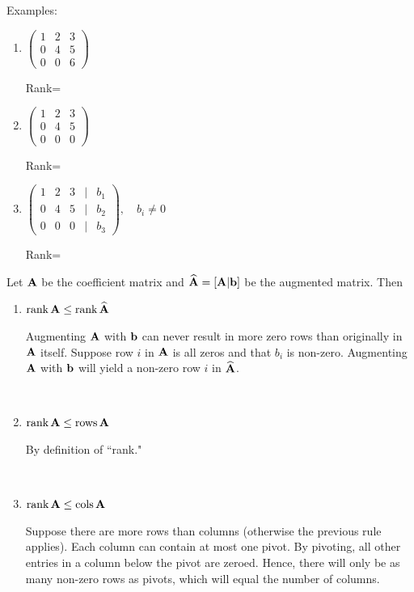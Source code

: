 \documentclass[]{book}
\theoremstyle{definition}
\theoremstyle{definition}
\theoremstyle{definition}
\theoremstyle{remark}
\begin{document}
Examples:

\begin{enumerate}
        \item \parbox[t]{2in}{$\begin{pmatrix} 1 & 2 & 3 \\
            0 & 4 & 5 \\
            0 & 0 & 6 \end{pmatrix}$}
              Rank=\phantom{3}
        \item \parbox[t]{2in}{$\begin{pmatrix} 1 & 2 & 3 \\ 
            0 & 4 & 5 \\
            0 & 0 & 0 \end{pmatrix}$}
            Rank=\phantom{2}

        \item \parbox[t]{2in}{$\begin{pmatrix} 1 & 2 & 3  & | & b_1 \\
            0 & 4 & 5 & | & b_2 \\
            0 & 0 & 0 & | & b_3 \end{pmatrix}, \quad b_i\ne 0$}
            Rank=\phantom{3}
\end{enumerate}

Let \(\bf A\) be the coefficient matrix and
\(\widehat{\bf A}=[ {\bf A} | {\bf b}]\) be the augmented matrix. Then

\begin{enumerate}
        \item \parbox[t]{1.75in}{$\mbox{rank\,} {\bf A} \le \mbox{rank\,} \widehat{\bf A}$} \parbox[t]{4in}{Augmenting $\bf A$ with $\bf b$ can never result in more zero rows than originally in $\bf A$ itself.  Suppose row $i$ in $\bf A$ is all zeros and that $b_i$ is non-zero.  Augmenting $\bf A$ with $\bf b$ will yield a non-zero row $i$ in $\widehat{\bf A}$.}\\
        
        \item \parbox[t]{1.75in}{$\mbox{rank\,} {\bf A} \le \mbox{rows\,} {\bf A}$} 
            \parbox[t]{4in}{By definition of ``rank."}\\[-6pt]
        \item \parbox[t]{1.75in}{$\mbox{rank\,} {\bf A} \le \mbox{cols\,} {\bf A}$}
            \parbox[t]{4in}{Suppose there are more rows than columns (otherwise the previous rule applies).  Each column can contain at most one pivot.  By
pivoting, all other entries in a column below the pivot are zeroed. Hence, there will only be as many non-zero rows as pivots, which will equal the number of columns.}
    \end{enumerate}
\end{document}
